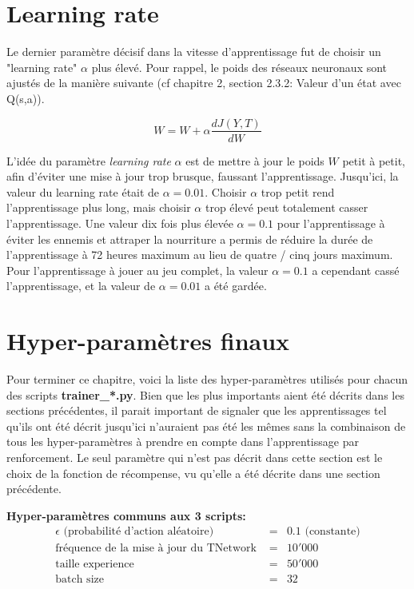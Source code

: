\documentclass[11pt,a4paper]{report}
\begin{document}
   \section{Learning rate}
   
   \par Le dernier paramètre décisif dans la vitesse d'apprentissage fut de choisir un "learning rate" $\alpha$ plus élevé. Pour rappel, le poids des réseaux neuronaux sont ajustés de la manière suivante (cf chapitre 2, section 2.3.2: Valeur d’un état avec Q(s,a)). 
   
   $$W = W + \alpha \frac{dJ(Y,T)}{dW}$$
   
   \par L'idée du paramètre \textit{learning rate} $\alpha$ est de mettre à jour le poids $W$ petit à petit, afin d'éviter une mise à jour trop brusque, faussant l'apprentissage. Jusqu'ici, la valeur du learning rate était de $\alpha = 0.01$. Choisir $\alpha$ trop petit rend l'apprentissage plus long, mais choisir $\alpha$ trop élevé peut totalement casser l'apprentissage. Une valeur dix fois plus élevée $\alpha = 0.1$ pour l'apprentissage à éviter les ennemis et attraper la nourriture a permis de réduire la durée de l'apprentissage à 72 heures maximum au lieu de quatre / cinq jours maximum. Pour l'apprentissage à jouer au jeu complet, la valeur $\alpha = 0.1$ a cependant cassé l'apprentissage, et la valeur de $\alpha = 0.01$ a été gardée. 
   
  \section{Hyper-paramètres finaux}
  
  \par Pour terminer ce chapitre, voici la liste des hyper-paramètres utilisés pour chacun des scripts \textbf{trainer\_*.py}. Bien que les plus importants aient été décrits dans les sections précédentes, il parait important de signaler que les apprentissages tel qu'ils ont été décrit jusqu'ici n'auraient pas été les mêmes sans la combinaison de tous les hyper-paramètres à prendre en compte dans l'apprentissage par renforcement. Le seul paramètre qui n'est pas décrit dans cette section est le choix de la fonction de récompense, vu qu'elle a été décrite dans une section précédente. 
  
   \textbf{Hyper-paramètres communs aux 3 scripts:}   
   \begin{eqnarray}
   \epsilon \text{ (probabilité d'action aléatoire) } &=& 0.1 \text{ (constante)} \\
   \text{fréquence de la mise à jour du TNetwork } &=& 10'000 \\
   \text{taille experience } &=& 50'000 \\
   \text{batch size } &=& 32 
   \end{eqnarray}
   
\end{document}

